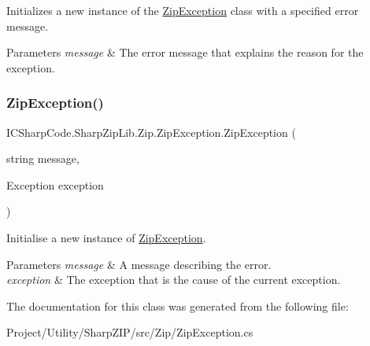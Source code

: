 Initializes a new instance of the \hyperlink{class_i_c_sharp_code_1_1_sharp_zip_lib_1_1_zip_1_1_zip_exception}{Zip\+Exception} class with a specified error message. 


\begin{DoxyParams}{Parameters}
{\em message} & The error message that explains the reason for the exception.\\
\hline
\end{DoxyParams}
\mbox{\label{class_i_c_sharp_code_1_1_sharp_zip_lib_1_1_zip_1_1_zip_exception_a58a5042586b6da5c9403b751536c4096}} 
\subsubsection{\texorpdfstring{Zip\+Exception()}{ZipException()}\hspace{0.1cm}{\footnotesize\ttfamily [4/4]}}
{\footnotesize\ttfamily I\+C\+Sharp\+Code.\+Sharp\+Zip\+Lib.\+Zip.\+Zip\+Exception.\+Zip\+Exception (\begin{DoxyParamCaption}\item[{string}]{message,  }\item[{Exception}]{exception }\end{DoxyParamCaption})\hspace{0.3cm}{\ttfamily [inline]}}



Initialise a new instance of \hyperlink{class_i_c_sharp_code_1_1_sharp_zip_lib_1_1_zip_1_1_zip_exception}{Zip\+Exception}. 


\begin{DoxyParams}{Parameters}
{\em message} & A message describing the error.\\
\hline
{\em exception} & The exception that is the cause of the current exception.\\
\hline
\end{DoxyParams}


The documentation for this class was generated from the following file\+:\begin{DoxyCompactItemize}
\item 
Project/\+Utility/\+Sharp\+Z\+I\+P/src/\+Zip/Zip\+Exception.\+cs\end{DoxyCompactItemize}
